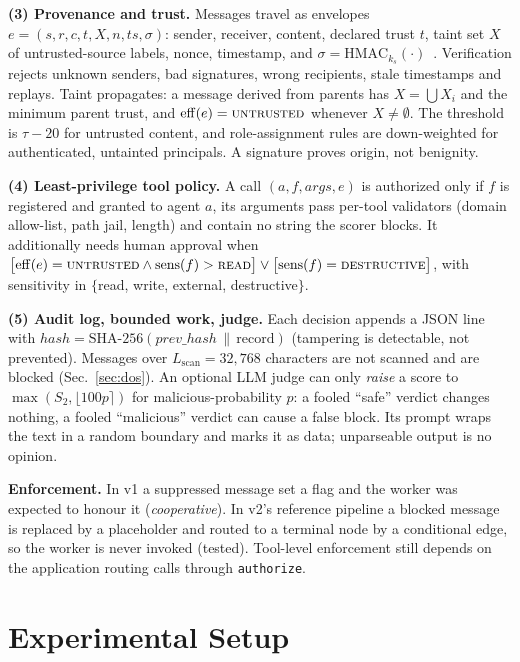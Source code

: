 \documentclass[conference]{IEEEtran}
\begin{document}
\textbf{(3) Provenance and trust.} Messages travel as envelopes
$e=(s,r,c,t,X,n,\mathit{ts},\sigma)$: sender, receiver, content, declared trust $t$,
taint set $X$ of untrusted-source labels, nonce, timestamp, and
$\sigma=\mathrm{HMAC}_{k_s}(\cdot)$~\cite{rfc2104}. Verification rejects unknown senders,
bad signatures, wrong recipients, stale timestamps and replays. Taint propagates: a
message derived from parents has $X=\bigcup X_i$ and the minimum parent trust, and
$\mathrm{eff}(e)=\textsc{untrusted}$ whenever $X\neq\emptyset$. The threshold is
$\tau-20$ for untrusted content, and role-assignment rules are down-weighted for
authenticated, untainted principals. A signature proves origin, not benignity.

\textbf{(4) Least-privilege tool policy.} A call $(a,f,\mathit{args},e)$ is authorized
only if $f$ is registered and granted to agent $a$, its arguments pass per-tool
validators (domain allow-list, path jail, length) and contain no string the scorer
blocks. It additionally needs human approval when
$\bigl[\mathrm{eff}(e)=\textsc{untrusted}\wedge\mathrm{sens}(f)>\textsc{read}\bigr]
\vee\bigl[\mathrm{sens}(f)=\textsc{destructive}\bigr]$, with sensitivity in
$\{$read, write, external, destructive$\}$.

\textbf{(5) Audit log, bounded work, judge.} Each decision appends a JSON line with
$\mathit{hash}=\mathrm{SHA\text{-}256}(\mathit{prev\_hash}\,\|\,\text{record})$ (tampering
is detectable, not prevented). Messages over $L_{\mathrm{scan}}=32{,}768$ characters
are not scanned and are blocked (Sec.~\ref{sec:dos}). An optional LLM judge can only
\emph{raise} a score to $\max(S_2,\lfloor100p\rceil)$ for malicious-probability $p$:
a fooled ``safe'' verdict changes nothing, a fooled ``malicious'' verdict can cause a
false block. Its prompt wraps the text in a random boundary and marks it as data;
unparseable output is no opinion.

\textbf{Enforcement.} In v1 a suppressed message set a flag and the worker was
expected to honour it (\emph{cooperative}). In v2's reference pipeline a blocked message
is replaced by a placeholder and routed to a terminal node by a conditional edge, so
the worker is never invoked (tested). Tool-level enforcement still depends on the
application routing calls through \texttt{authorize}.

\section{Experimental Setup}
\label{sec:setup}
\end{document}
